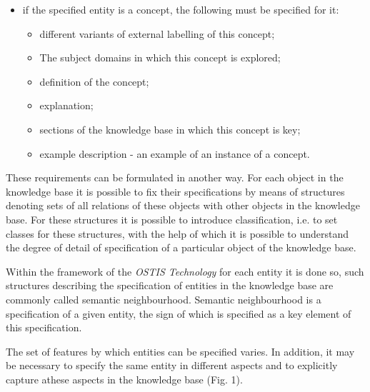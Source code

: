 \documentclass{scndocument}
\begin{document}
\begin{multicols}{2}
\begin{itemize}
    \item if the specified entity is a concept, the following must be specified for it:
    \begin{itemize}
        \item different variants of external labelling of this concept;
    \end{itemize}
    \begin{itemize}
        \item The subject domains in which this concept is explored;
    \end{itemize}
    \begin{itemize}
        \item definition of the concept;
    \end{itemize}
    \begin{itemize}
        \item explanation;
    \end{itemize}
    \begin{itemize}
        \item sections of the knowledge base in which this concept is key;
    \end{itemize}
    \begin{itemize}
        \item example description - an example of an instance of a concept.
    \end{itemize}
\end{itemize}
These requirements can be formulated in another way. For each object in the knowledge base it is possible to fix their specifications by means of structures denoting sets of all relations of these objects with other objects
in the knowledge base. For these structures it is possible to introduce classification, i.e. to set classes for these structures, with the help of which it is possible to understand the degree of detail of specification of a
particular object of the knowledge base.

Within the framework of the \textit{OSTIS Technology}  for each entity it is done so, such structures describing the specification of entities in the knowledge base are commonly called semantic neighbourhood. Semantic neighbourhood is a specification of a given entity, the sign of which is specified as a key element of this specification.

The set of features by which entities can be specified varies. In addition, it may be necessary to specify the same entity in different aspects and to explicitly capture athese aspects in the knowledge base (Fig. 1).


\end{multicols}
\end{document}
